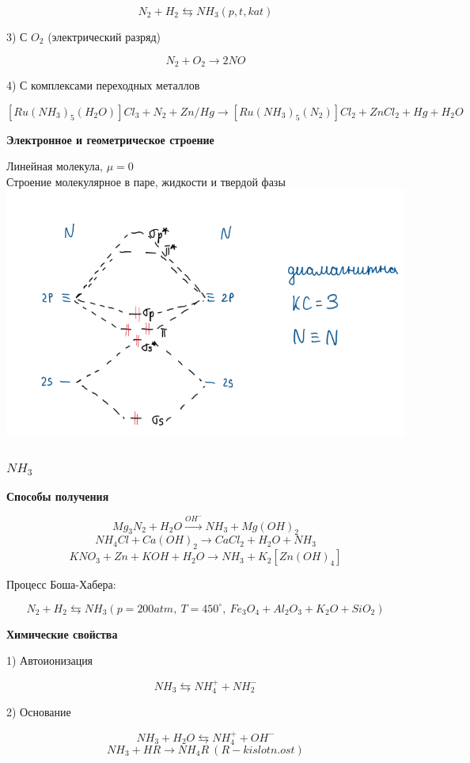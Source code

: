 \documentclass[14pt,a4paper]{scrartcl}
\begin{document}
$$N_2 + H_2 \leftrightarrows NH_3 (p,t,kat)$$

3) С $O_2$ (электрический разряд)

$$N_2 + O_2 \rightarrow 2NO$$

4) С комплексами переходных металлов

$$[Ru(NH_3)_5(H_2O)]Cl_3 + N_2 + Zn/Hg \rightarrow [Ru(NH_3)_5(N_2)]Cl_2 + ZnCl_2 + Hg + H_2O$$

\textbf{Электронное и геометрическое строение}

Линейная молекула, $\mu=0$\\
Строение молекулярное в паре, жидкости и твердой фазы\\
\includegraphics{8v1.png}

\subsubsection{$NH_3$}

\textbf{Способы получения}

$$Mg_3N_2 + H_2O \xrightarrow{OH^-} NH_3 + Mg(OH)_2$$
$$NH_4Cl + Ca(OH)_2 \rightarrow CaCl_2 + H_2O + NH_3$$
$$KNO_3 + Zn + KOH + H_2O \rightarrow NH_3 + K_2[Zn(OH)_4]$$

Процесс Боша-Хабера:

$$ N_2 + H_2 \leftrightarrows NH_3 (p=200 atm, \ T = 450^{\circ},\ Fe_3O_4 + Al_2O_3 + K_2O + SiO_2)$$

\textbf{Химические свойства}

1) Автоионизация

$$NH_3 \leftrightarrows NH_4^+ + NH_2^-$$

2)  Основание

$$NH_3 + H_2O \leftrightarrows NH_4^+ + OH^-$$
$$NH_3 + HR \rightarrow NH_4R \ (R - kislotn. ost)$$
\end{document}
